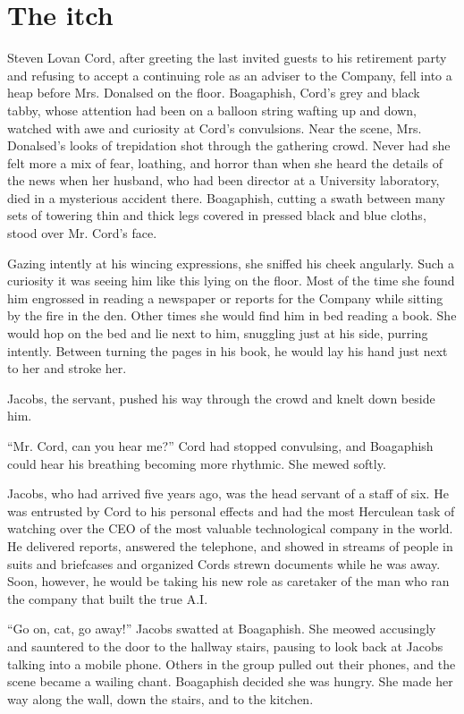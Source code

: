 \section{The itch}\label{the-itch}

Steven Lovan Cord, after greeting the last invited guests to his
retirement party and refusing to accept a continuing role as an adviser
to the Company, fell into a heap before Mrs. Donalsed on the floor.
Boagaphish, Cord's grey and black tabby, whose attention had been on a
balloon string wafting up and down, watched with awe and curiosity at
Cord's convulsions. Near the scene, Mrs. Donalsed's looks of trepidation
shot through the gathering crowd. Never had she felt more a mix of fear,
loathing, and horror than when she heard the details of the news when
her husband, who had been director at a University laboratory, died in a
mysterious accident there. Boagaphish, cutting a swath between many sets
of towering thin and thick legs covered in pressed black and blue
cloths, stood over Mr. Cord's face.

Gazing intently at his wincing expressions, she sniffed his cheek
angularly. Such a curiosity it was seeing him like this lying on the
floor. Most of the time she found him engrossed in reading a newspaper
or reports for the Company while sitting by the fire in the den. Other
times she would find him in bed reading a book. She would hop on the bed
and lie next to him, snuggling just at his side, purring intently.
Between turning the pages in his book, he would lay his hand just next
to her and stroke her.

Jacobs, the servant, pushed his way through the crowd and knelt down
beside him.

``Mr. Cord, can you hear me?'' Cord had stopped convulsing, and
Boagaphish could hear his breathing becoming more rhythmic. She mewed
softly.

Jacobs, who had arrived five years ago, was the head servant of a staff
of six. He was entrusted by Cord to his personal effects and had the
most Herculean task of watching over the CEO of the most valuable
technological company in the world. He delivered reports, answered the
telephone, and showed in streams of people in suits and briefcases and
organized Cord\textquotesingle s strewn documents while he was away.
Soon, however, he would be taking his new role as caretaker of the man
who ran the company that built the true A.I.

``Go on, cat, go away!'' Jacobs swatted at Boagaphish. She meowed
accusingly and sauntered to the door to the hallway stairs, pausing to
look back at Jacobs talking into a mobile phone. Others in the group
pulled out their phones, and the scene became a wailing chant.
Boagaphish decided she was hungry. She made her way along the wall, down
the stairs, and to the kitchen.

